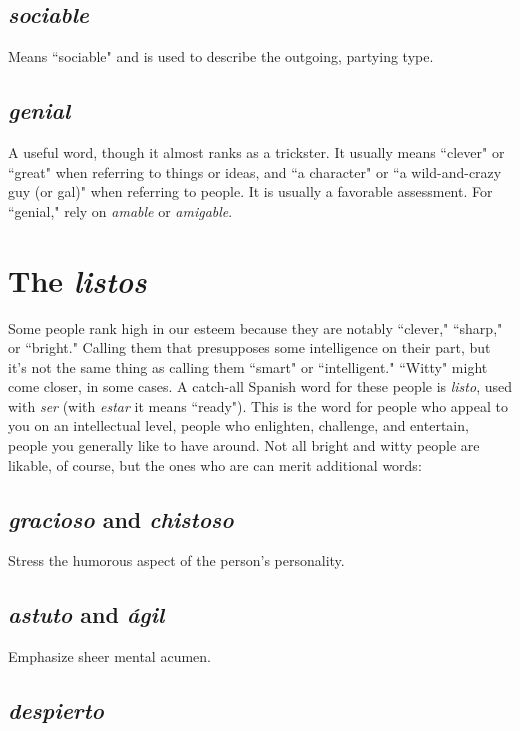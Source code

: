 \subsection{\emph{sociable}}

Means ``sociable" and is used to describe the outgoing, partying type.

\subsection{\emph{genial}}

A useful word, though it almost ranks as a trickster.
It usually means ``clever" or ``great" when referring to things or ideas,
and ``a character" or ``a wild-and-crazy guy (or gal)" when referring to
people. It is usually a favorable assessment. For ``genial," rely on \emph{amable} or \emph{amigable}.

\section{The \emph{listos}}

Some people rank high in our esteem because they are notably
``clever," ``sharp," or ``bright." Calling them that presupposes some intelligence on their part, but it's not the same thing as calling them
``smart" or ``intelligent." ``Witty" might come closer, in some cases. A
catch-all Spanish word for these people is \emph{listo}, used with \emph{ser} (with \emph{estar} it means ``ready"). This is the word for people who appeal to you on
an intellectual level, people who enlighten, challenge, and entertain,
people you generally like to have around.
Not all bright and witty people are likable, of course, but the
ones who are can merit additional words:

\subsection{\emph{gracioso} and \emph{chistoso}}

Stress the humorous aspect of the
person's personality.

\subsection{\emph{astuto} and \emph{ágil}}

Emphasize sheer mental acumen.

\subsection{\emph{despierto}}

